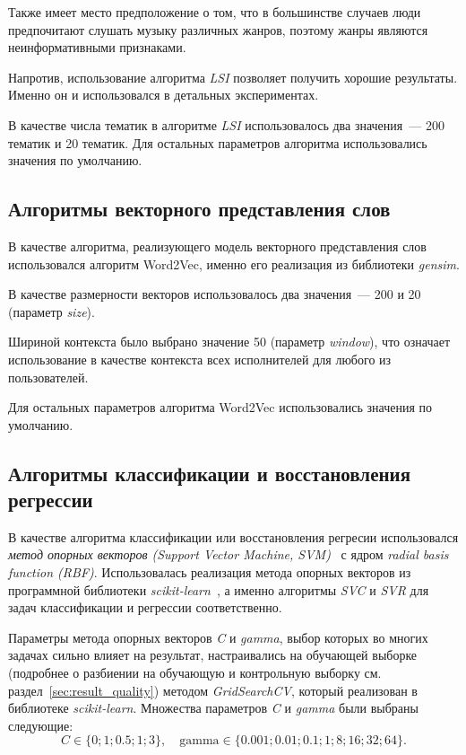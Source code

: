 Также имеет место предположение о том, что в большинстве случаев
люди предпочитают слушать музыку различных жанров, поэтому жанры
являются неинформативными признаками.

Напротив, использование алгоритма \textit{LSI} позволяет получить хорошие
результаты. Именно он и использовался в детальных экспериментах.

В качестве числа тематик в алгоритме \textit{LSI} использовалось
два значения~--- 200 тематик и 20 тематик. 
Для остальных параметров алгоритма использовались значения по умолчанию.

\subsection{Алгоритмы векторного представления слов}

В качестве алгоритма, реализующего модель векторного представления
слов использовался алгоритм Word2Vec, именно его реализация из
библиотеки \textit{gensim}.  

В качестве размерности векторов использовалось два значения~--- 200
и 20 (параметр \textit{size}).

Шириной контекста было выбрано значение 50 (параметр \textit{window}),
что означает использование в качестве контекста всех исполнителей для
любого из пользователей.

Для остальных параметров алгоритма Word2Vec использовались значения
по умолчанию.

\subsection{Алгоритмы классификации и восстановления регрессии}

В качестве алгоритма классификации или восстановления регресии
использовался \textit{метод опорных векторов (Support Vector Machine,
SVM)}~\cite{cortes1995support} с ядром 
\textit{radial basis function (RBF)}. Использовалась реализация
метода опорных векторов из программной библиотеки 
\textit{scikit-learn}~\cite{sklearn}, а именно алгоритмы
\textit{SVC} и \textit{SVR} для задач классификации и регрессии
соответственно.

Параметры метода опорных векторов \textit{C} и \textit{gamma},
выбор которых во многих задачах сильно влияет на результат,
настраивались на обучающей выборке (подробнее о разбиении
на обучающую и контрольную выборку см.
раздел~\ref{sec:result_quality}) методом \textit{GridSearchCV},
который реализован в библиотеке \textit{scikit-learn}. Множества
параметров \textit{C} и \textit{gamma} были выбраны следующие:
\[
    C \in \{0; 1; 0.5; 1; 3\},\quad
    \mathrm{gamma} \in \{0.001; 0.01; 0.1; 1; 8; 16; 32; 64\}.
\]

